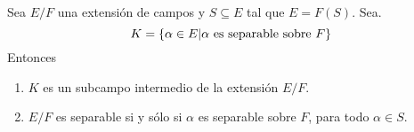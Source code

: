 \documentclass[12pt]{report}
\theoremstyle{largebreak}
\begin{document}
    \begin{propo}
        Sea $E/F$ una extensión de campos y $S\subseteq E$ tal que $E=F(S)$. Sea.
        \begin{equation}
            K = \left\{\alpha\in E | \alpha \textup{ es separable sobre }F\right\}\label{equation:k_sep_cer}
        \end{equation}
        Entonces
        \begin{enumerate}
            \item $K$ es un subcampo intermedio de la extensión $E/F$.
            \item $E/F$ es separable si y sólo si $\alpha$ es separable sobre $F$, para todo $\alpha\in S$.
        \end{enumerate}
    \end{propo}
\end{document}
